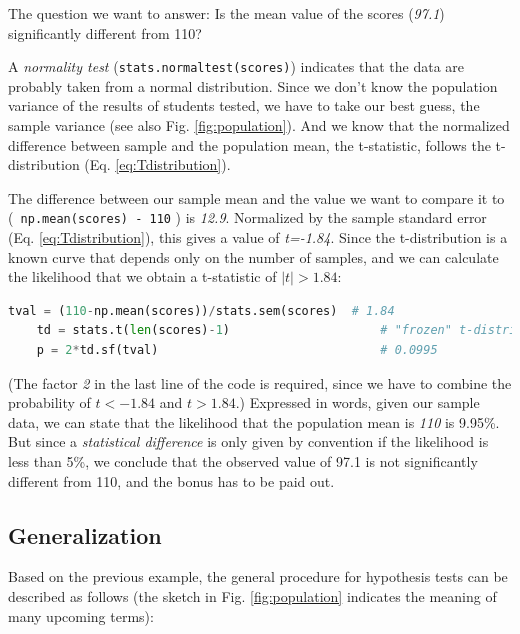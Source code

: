 The question we want to answer: Is the mean value of the scores (\emph{97.1}) significantly different from 110?

A \emph{normality test} (\lstinline{stats.normaltest(scores)}) indicates that the data are probably taken from a normal distribution.  Since we don't know the population variance of the results of students tested, we have to take our best guess, the sample variance (see also Fig. \ref{fig:population}). And we know that the normalized difference between sample and the population mean, the t-statistic, follows the t-distribution (Eq. \ref{eq:Tdistribution}).

The difference between our sample mean and the value we want to compare it to (\lstinline{ np.mean(scores) - 110} ) is \emph{12.9}. Normalized by the sample standard error (Eq. \ref{eq:Tdistribution}), this gives a value of \emph{t=-1.84}. Since the t-distribution is a known curve that depends only on the number of samples, and we can calculate the likelihood that we obtain a t-statistic of $|t| > 1.84$:

\begin{lstlisting}[language=Python]
    tval = (110-np.mean(scores))/stats.sem(scores)  # 1.84
    td = stats.t(len(scores)-1)                     # "frozen" t-distribution
    p = 2*td.sf(tval)                               # 0.0995
\end{lstlisting}

(The factor \emph{2} in the last line of the code is required, since we have to combine the probability of $t<-1.84$ and $t>1.84$.) Expressed in words, given our sample data, we can state that the likelihood that the population mean is \emph{110} is 9.95\%. But since a \emph{statistical difference} is only given by convention if the likelihood is less than 5\%, we conclude that the observed value of 97.1 is not significantly different from 110, and the bonus has to be paid out.

\subsection{Generalization}

Based on the previous example, the general procedure for hypothesis tests can be described as follows (the sketch in Fig. \ref{fig:population} indicates the meaning of many upcoming terms):

